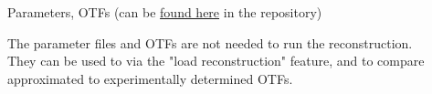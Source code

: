 \documentclass[twoside=false,
           a4paper,
           10pt,DIV=16,parindent=none,parskip=half]{article}
\begin{document}

Parameters, OTFs (can be
\href{https://github.com/fairSIM/test-datasets/tree/master/parameters}
{found here} in the repository)
\\
The parameter files and OTFs are not needed to run the reconstruction.\\
They can be used to via the "load reconstruction" feature, and to
compare approximated to experimentally determined OTFs.


\end{document}
